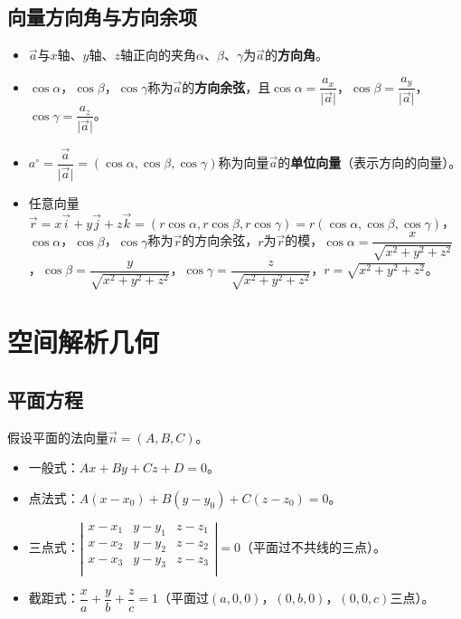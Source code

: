 \documentclass[UTF8, 12pt]{ctexart}
\begin{document}
\subsection{向量方向角与方向余项}

\begin{itemize}
    \item $\vec{a}$与$x$轴、$y$轴、$z$轴正向的夹角$\alpha$、$\beta$、$\gamma$为$\vec{a}$的\textbf{方向角}。
    \item $\cos\alpha$，$\cos\beta$，$\cos\gamma$称为$\vec{a}$的\textbf{方向余弦}，且$\cos\alpha=\dfrac{a_x}{\vert\vec{a}\vert}$，$\cos\beta=\dfrac{a_y}{\vert\vec{a}\vert}$，$\cos\gamma=\dfrac{a_z}{\vert\vec{a}\vert}$。
    \item $a^\circ=\dfrac{\vec{a}}{\vert\vec{a}\vert}=(\cos\alpha,\cos\beta,\cos\gamma)$称为向量$\vec{a}$的\textbf{单位向量}（表示方向的向量）。
    \item 任意向量$\vec{r}=x\vec{i}+y\vec{j}+z\vec{k}=(r\cos\alpha,r\cos\beta,r\cos\gamma)=r(\cos\alpha,\cos\beta,\cos\gamma)$，$\cos\alpha$，$\cos\beta$，$\cos\gamma$称为$\vec{r}$的方向余弦，$r$为$\vec{r}$的模，$\cos\alpha=\dfrac{x}{\sqrt{x^2+y^2+z^2}}$，$\cos\beta=\dfrac{y}{\sqrt{x^2+y^2+z^2}}$，$\cos\gamma=\dfrac{z}{\sqrt{x^2+y^2+z^2}}$，$r=\sqrt{x^2+y^2+z^2}$。
\end{itemize}

\section{空间解析几何}

\subsection{平面方程}

假设平面的法向量$\vec{n}=(A,B,C)$。

\begin{itemize}
    \item 一般式：$Ax+By+Cz+D=0$。
    \item 点法式：$A(x-x_0)+B(y-y_0)+C(z-z_0)=0$。
    \item 三点式：$\left\vert\begin{array}{ccc}
        x-x_1 & y-y_1 & z-z_1 \\
        x-x_2 & y-y_2 & z-z_2 \\
        x-x_3 & y-y_3 & z-z_3 \\
    \end{array}\right\vert=0$（平面过不共线的三点）。
    \item 截距式：$\dfrac{x}{a}+\dfrac{y}{b}+\dfrac{z}{c}=1$（平面过$(a,0,0)$，$(0,b,0)$，$(0,0,c)$三点）。
\end{itemize}
\end{document}
